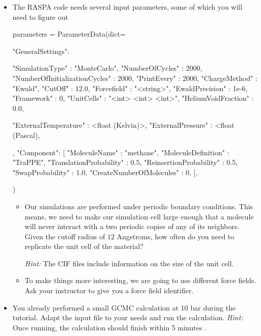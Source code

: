 \documentclass[twoside,a4paper,11pt]{extarticle}
\begin{document}
\begin{itemize}
    \item The RASPA code needs several input parameters, some of which you will need to figure out
\begin{pythoncommand}
parameters = ParameterData(dict={
    "GeneralSettings":
    {
    "SimulationType"                   : "MonteCarlo",
    "NumberOfCycles"                   : 2000,
    "NumberOfInitializationCycles"     : 2000,
    "PrintEvery"                       : 2000,
    "ChargeMethod"                     : "Ewald",
    "CutOff"                           : 12.0,
    "Forcefield"                       : "<string>",
    "EwaldPrecision"                   : 1e-6,
    "Framework"                        : 0,
    "UnitCells"                        : "<int> <int> <int>",
    "HeliumVoidFraction"               : 0.0,

    "ExternalTemperature"              : <float (Kelvin)>,
    "ExternalPressure"                 : <float (Pascal),
    },
    "Component":
    [{
    "MoleculeName"                     : "methane",
    "MoleculeDefinition"               : "TraPPE",
    "TranslationProbability"           : 0.5,
    "ReinsertionProbability"           : 0.5,
    "SwapProbability"                  : 1.0,
    "CreateNumberOfMolecules"          : 0,
    }],
})
\end{pythoncommand}
    \begin{itemize}
        \item Our simulations are performed under periodic boundary conditions.
        This means, we need to make our simulation cell large enough that a molecule
        will never interact with a two periodic copies of any of its neighbors.
        Given the cutoff radius of $12$ Angstroms, how often do you need to replicate the unit cell
        of the material?
        
        \emph{Hint:} The CIF files include information on the size of the unit cell.
        \item To make things more interesting, we are going to use different force fields.
        Ask your instructor to give you a force field identifier.
    \end{itemize}
    \item You already performed a small GCMC calculation at 10 bar during the tutorial. 
    Adapt the input file to your needs and run the calculation.
    \emph{Hint:} Once running, the calculation should finish within 5 minutes .
\end{itemize}
\end{document}
